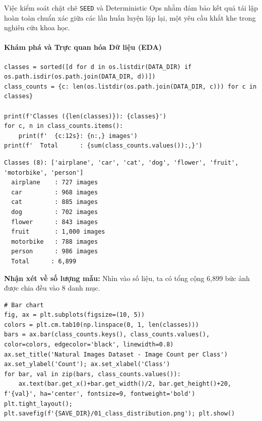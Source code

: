 Việc kiểm soát chặt chẽ \texttt{SEED} và Deterministic Ops nhằm đảm bảo kết quả tái lập hoàn toàn chuẩn xác giữa các lần huấn luyện lặp lại, một yêu cầu khắt khe trong nghiên cứu khoa học.

\paragraph{Khám phá và Trực quan hóa Dữ liệu (EDA)} \hfill\mbox{}

\begin{lstlisting}[style=pythoncode, caption={Thống kê số lượng theo 8 danh mục vật thể}]
classes = sorted([d for d in os.listdir(DATA_DIR) if os.path.isdir(os.path.join(DATA_DIR, d))])
class_counts = {c: len(os.listdir(os.path.join(DATA_DIR, c))) for c in classes}

print(f'Classes ({len(classes)}): {classes}')
for c, n in class_counts.items():
    print(f'  {c:12s}: {n:,} images')
print(f'  Total      : {sum(class_counts.values()):,}')
\end{lstlisting}

\begin{lstlisting}[style=consoleoutput, caption={Output: Chi tiết số lượng mẫu ảnh}]
Classes (8): ['airplane', 'car', 'cat', 'dog', 'flower', 'fruit', 'motorbike', 'person']
  airplane    : 727 images
  car         : 968 images
  cat         : 885 images
  dog         : 702 images
  flower      : 843 images
  fruit       : 1,000 images
  motorbike   : 788 images
  person      : 986 images
  Total      : 6,899
\end{lstlisting}

\textbf{Nhận xét về số lượng mẫu:} Nhìn vào số liệu, ta có tổng cộng 6,899 bức ảnh được chia đều vào 8 danh mục.

\begin{lstlisting}[style=pythoncode, caption={Trực quan hóa biểu đồ phân bố dữ liệu (Bar Chart)}]
# Bar chart
fig, ax = plt.subplots(figsize=(10, 5))
colors = plt.cm.tab10(np.linspace(0, 1, len(classes)))
bars = ax.bar(class_counts.keys(), class_counts.values(), color=colors, edgecolor='black', linewidth=0.8)
ax.set_title('Natural Images Dataset - Image Count per Class')
ax.set_ylabel('Count'); ax.set_xlabel('Class')
for bar, val in zip(bars, class_counts.values()):
    ax.text(bar.get_x()+bar.get_width()/2, bar.get_height()+20, f'{val}', ha='center', fontsize=9, fontweight='bold')
plt.tight_layout(); plt.savefig(f'{SAVE_DIR}/01_class_distribution.png'); plt.show()
\end{lstlisting}

